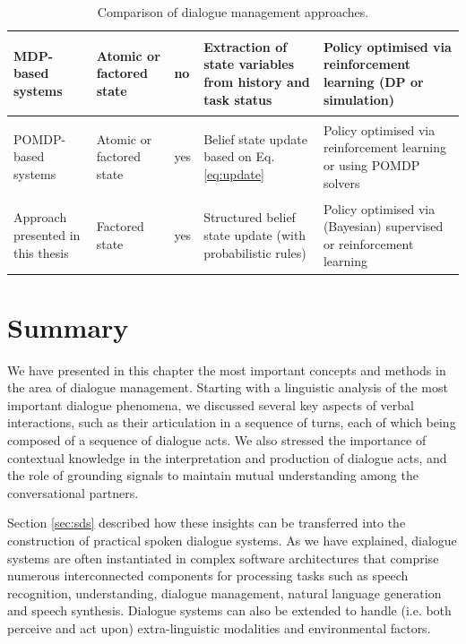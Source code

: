 \begin{table}
\begin{center}
\begin{tabular}{|p{50mm}||p{40mm}|p{18mm}|p{50mm}|p{58mm}|}
MDP-based systems  \begin{footnotesize}\citep[e.g.][]{Walker:2000,817450}\end{footnotesize} & Atomic or factored state & no & Extraction of state variables from history and task status & Policy optimised via reinforcement learning (DP or simulation) \vspace{5pt} \\ \hline
POMDP-based systems  \begin{footnotesize}\citep[e.g.][]{Roy:2000,Young:2010}\end{footnotesize} \vspace{5pt} & Atomic or factored state & yes & Belief state update based on Eq. \ref{eq:update} & Policy optimised via reinforcement learning or using POMDP solvers \vspace{5pt} \\ \hline
Approach presented in this thesis & Factored state & yes & Structured belief state update (with probabilistic rules) & Policy optimised via (Bayesian) supervised or reinforcement learning \vspace{5pt} \\ \hline 
\end{tabular}
\end{center}
\caption{Comparison of dialogue management approaches.}
\label{table:approaches}
\end{table}

\section{Summary}

We have presented in this chapter the most important concepts and methods in the area of dialogue management.  Starting with a linguistic analysis of the most important dialogue phenomena, we discussed several key aspects of verbal interactions, such as their articulation in a sequence of turns, each of which being composed of a sequence of dialogue acts. We also stressed the importance of contextual knowledge in the interpretation and production of dialogue acts, and the role of grounding signals to maintain mutual understanding among the conversational partners. 

Section \ref{sec:sds} described how these insights can be transferred into the construction of practical spoken dialogue systems.  As we have explained, dialogue systems are often instantiated in complex software architectures that comprise numerous interconnected components for processing tasks such as speech recognition, understanding, dialogue management, natural language generation and speech synthesis.  Dialogue systems can also be extended to handle (i.e. both perceive and act upon) extra-linguistic modalities and environmental factors.


